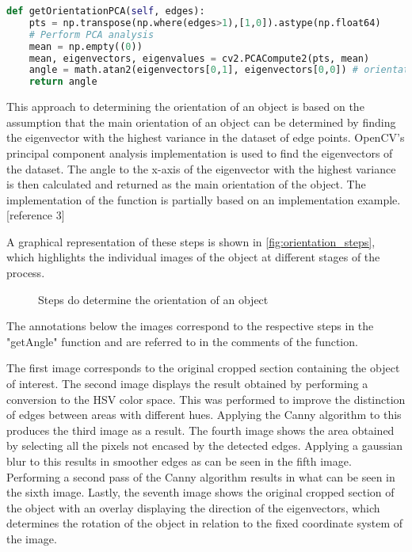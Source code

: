 \begin{lstlisting}[language=python]
def getOrientationPCA(self, edges):
    pts = np.transpose(np.where(edges>1),[1,0]).astype(np.float64)
    # Perform PCA analysis
    mean = np.empty((0))
    mean, eigenvectors, eigenvalues = cv2.PCACompute2(pts, mean)
    angle = math.atan2(eigenvectors[0,1], eigenvectors[0,0]) # orientation in radians
    return angle
\end{lstlisting}
This approach to determining the orientation of an object is based on the assumption that the main orientation of an object can be determined by finding the eigenvector with the highest variance in the dataset of edge points. OpenCV's principal component analysis implementation is used to find the eigenvectors of the dataset. The angle to the x-axis of the eigenvector with the highest variance is then calculated and returned as the main orientation of the object. The implementation of the function is partially based on an implementation example. [reference 3]

A graphical representation of these steps is shown in \vref{fig:orientation_steps}, which highlights the individual images of the object at different stages of the process. 

\begin{figure}[!h]
    \centering
    \caption{Steps do determine the orientation of an object }
    \label{fig:orientation_steps}
\end{figure}

The annotations below the images correspond to the respective steps in the "getAngle" function and are referred to in the comments of the function.

The first image corresponds to the original cropped section containing the object of interest. The second image displays the result obtained by performing a conversion to the HSV color space. This was performed to improve the distinction of edges between areas with different hues. Applying the Canny algorithm to this produces the third image as a result. The fourth image shows the area obtained by selecting all the pixels not encased by the detected edges. Applying a gaussian blur to this results in smoother edges as can be seen in the fifth image. Performing a second pass of the Canny algorithm results in what can be seen in the sixth image. Lastly, the seventh image shows the original cropped section of the object with an overlay displaying the direction of the eigenvectors, which determines the rotation of the object in relation to the fixed coordinate system of the image.

